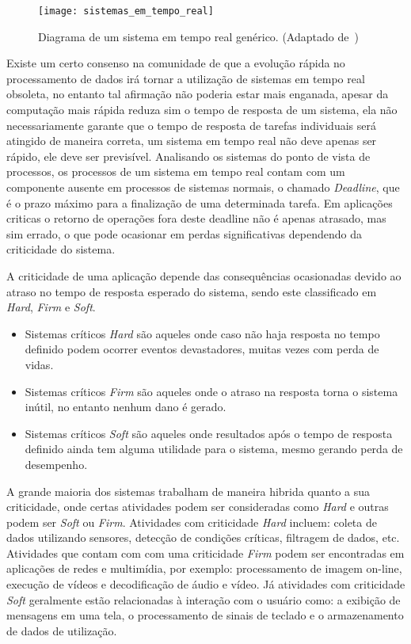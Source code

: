 \begin{figure}[h]
	\texttt{[image: sistemas\_em\_tempo\_real]}
    \centering
    \caption{Diagrama de um sistema em tempo real genérico. (Adaptado de~\cite{BUTTAZZO:2011})}
    \label{fig:rt}
\end{figure}

Existe um certo consenso na comunidade de que a evolução rápida no processamento de dados irá tornar a utilização de sistemas em tempo real obsoleta, no entanto tal afirmação não poderia estar mais enganada, apesar da computação mais rápida reduza sim o tempo de resposta de um sistema, ela não necessariamente garante que o tempo de resposta de tarefas individuais será atingido de maneira correta, um sistema em tempo real não deve apenas ser rápido, ele deve ser previsível. Analisando os sistemas do ponto de vista de processos, os processos de um sistema em tempo real contam com um componente ausente em processos de sistemas normais, o chamado \textit{Deadline}, que é o prazo máximo para a finalização de uma determinada tarefa. Em aplicações criticas o retorno de operações fora deste deadline não é apenas atrasado, mas sim errado, o que pode ocasionar em perdas significativas dependendo da criticidade do sistema.

A criticidade de uma aplicação depende das consequências ocasionadas devido ao atraso no tempo de resposta esperado do sistema, sendo este classificado em \textit{Hard}, \textit{Firm} e \textit{Soft}.
\begin{itemize}
\item Sistemas críticos \textit{Hard} são aqueles onde caso não haja resposta no tempo definido podem ocorrer eventos devastadores, muitas vezes com perda de vidas.
\item Sistemas críticos \textit{Firm} são aqueles onde o atraso na resposta torna o sistema inútil, no entanto nenhum dano é gerado.
\item Sistemas críticos \textit{Soft} são aqueles onde resultados após o tempo de resposta definido ainda tem alguma utilidade para o sistema, mesmo gerando perda de desempenho.
\end{itemize}

A grande maioria dos sistemas trabalham de maneira hibrida quanto a sua criticidade, onde certas atividades podem ser consideradas como \textit{Hard} e outras podem ser \textit{Soft} ou \textit{Firm}. Atividades com criticidade \textit{Hard} incluem: coleta de dados utilizando sensores, detecção de condições críticas, filtragem de dados, etc. Atividades que contam com com uma criticidade \textit{Firm} podem ser encontradas em aplicações de redes e multimídia, por exemplo: processamento de imagem on-line, execução de vídeos e decodificação de áudio e vídeo. Já atividades com criticidade \textit{Soft} geralmente estão relacionadas à interação com o usuário como: a exibição de mensagens em uma tela, o processamento de sinais de teclado e o armazenamento de dados de utilização.

